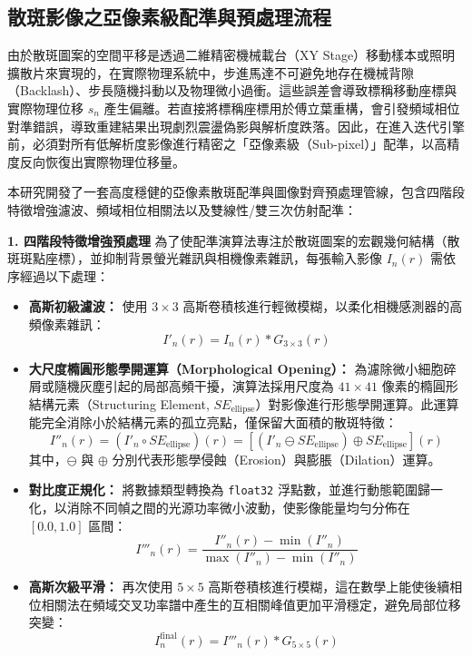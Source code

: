 \subsection{散斑影像之亞像素級配準與預處理流程}

由於散斑圖案的空間平移是透過二維精密機械載台（XY Stage）移動樣本或照明擴散片來實現的，在實際物理系統中，步進馬達不可避免地存在機械背隙（Backlash）、步長隨機抖動以及物理微小過衝。這些誤差會導致標稱移動座標與實際物理位移 $s_n$ 產生偏離。若直接將標稱座標用於傅立葉重構，會引發頻域相位對準錯誤，導致重建結果出現劇烈震盪偽影與解析度跌落。因此，在進入迭代引擎前，必須對所有低解析度影像進行精密之「亞像素級（Sub-pixel）」配準，以高精度反向恢復出實際物理位移量。

本研究開發了一套高度穩健的亞像素散斑配準與圖像對齊預處理管線，包含四階段特徵增強濾波、頻域相位相關法以及雙線性/雙三次仿射配準：

\textbf{1. 四階段特徵增強預處理}
為了使配準演算法專注於散斑圖案的宏觀幾何結構（散斑斑點座標），並抑制背景螢光雜訊與相機像素雜訊，每張輸入影像 $I_n(r)$ 需依序經過以下處理：
\begin{itemize}
    \item \textbf{高斯初級濾波：} 使用 $3 \times 3$ 高斯卷積核進行輕微模糊，以柔化相機感測器的高頻像素雜訊：
    \begin{equation}
        I'_n(r) = I_n(r) * G_{3\times 3}(r)
    \end{equation}
    \item \textbf{大尺度橢圓形態學開運算（Morphological Opening）：} 為濾除微小細胞碎屑或隨機灰塵引起的局部高頻干擾，演算法採用尺度為 $41 \times 41$ 像素的橢圓形結構元素（Structuring Element, $SE_{\text{ellipse}}$）對影像進行形態學開運算。此運算能完全消除小於結構元素的孤立亮點，僅保留大面積的散斑特徵：
    \begin{equation}
        I''_n(r) = (I'_n \circ SE_{\text{ellipse}})(r) = \left[ (I'_n \ominus SE_{\text{ellipse}}) \oplus SE_{\text{ellipse}} \right] (r)
    \end{equation}
    其中，$\ominus$ 與 $\oplus$ 分別代表形態學侵蝕（Erosion）與膨脹（Dilation）運算。
    \item \textbf{對比度正規化：} 將數據類型轉換為 \texttt{float32} 浮點數，並進行動態範圍歸一化，以消除不同幀之間的光源功率微小波動，使影像能量均勻分佈在 $[0.0, 1.0]$ 區間：
    \begin{equation}
        I'''_n(r) = \frac{I''_n(r) - \min(I''_n)}{\max(I''_n) - \min(I''_n)}
    \end{equation}
    \item \textbf{高斯次級平滑：} 再次使用 $5 \times 5$ 高斯卷積核進行模糊，這在數學上能使後續相位相關法在頻域交叉功率譜中產生的互相關峰值更加平滑穩定，避免局部位移突變：
    \begin{equation}
        I^{\text{final}}_n(r) = I'''_n(r) * G_{5\times 5}(r)
    \end{equation}
\end{itemize}

